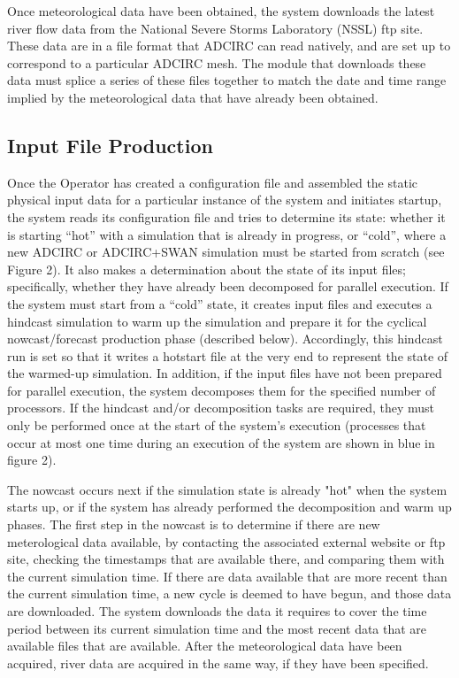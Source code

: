 \documentclass[12pt]{article}
\begin{document}
Once meteorological data have been obtained, the system downloads 
the latest river flow data from the National Severe Storms 
Laboratory (NSSL) ftp site. These data are in a file format that 
ADCIRC can read natively, and are set up to correspond to a 
particular ADCIRC mesh. The module that downloads these data must 
splice a series of these files together to match the date and time 
range implied by the meteorological data that have already been 
obtained. 

\subsection{Input File Production}

Once the Operator has created a configuration file and assembled the 
static physical input data for a particular instance of the system 
and initiates startup, the system reads its configuration file and 
tries to determine its state: whether it is starting “hot” with a 
simulation that is already in progress, or “cold”, where a new 
ADCIRC or ADCIRC+SWAN simulation must be started from scratch (see 
Figure 2). It also makes a determination about the state of its 
input files; specifically, whether they have already been decomposed 
for parallel execution. If the system must start from a “cold” 
state, it creates input files and executes a hindcast simulation to 
warm up the simulation and prepare it for the cyclical 
nowcast/forecast production phase (described below). Accordingly, 
this hindcast run is set so that it writes a hotstart file at the 
very end to represent the state of the warmed-up simulation. In 
addition, if the input files have not been prepared for parallel 
execution, the system decomposes them for the specified number of 
processors. If the hindcast and/or decomposition tasks are required, 
they must only be performed once at the start of the system's 
execution (processes that occur at most one time during an execution 
of the system are shown in blue in figure 2).

The nowcast occurs next if the simulation state is already "hot" 
when the system starts up, or if the system has already performed 
the decomposition and warm up phases. The first step in the nowcast 
is to determine if there are new meterological data available, by 
contacting the associated external website or ftp site, checking the 
timestamps that are available there, and comparing them with the 
current simulation time. If there are data available that are more 
recent than the current simulation time, a new cycle is deemed to 
have begun, and those data are downloaded. The system downloads the 
data it requires to cover the time period between its current 
simulation time and the most recent data that are available files 
that are available. After the meteorological data have been 
acquired, river data are acquired in the same way, if they have been 
specified. 
\end{document}
